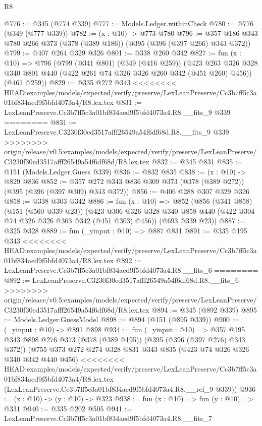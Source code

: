 \begin{lexlean}{R8}
\begin{coremodule}
{{{{{{{{{{{{{{{{{{{{{{{@776 := @345 (@774 @339)
@777 := Models.Ledger.withinCheck
@780 := @776 (@349 (@777 @339))
@782 := (x : @10) -> @773 @780
@796 := @357 @186 @343 @780 @266 @373 (@378 (@389 @186)) (@395 (@396 (@397 @266) @343 @372))
@799 := @407 @264 @329 @326
@801 := @338 @260 @342
@827 := fun (x : @10) =>
  @796
    (@799
      (@341 @801)
      (@349 (@416 @259))
      (@423 @263 @326 @328 @340 @801 @440 (@422 @261 @74 @326 @326 @260 @342 (@451 @260) @456))
      (@461 @259))
@829 := @335 @272 @343
<<<<<<<< HEAD:examples/models/expected/verify/preserve/LexLeanPreserve/Cc3b7ff5c3a01bf834aed9f5bfd4073a4/R8.lex.tex
@831 := LexLeanPreserve.Cc3b7ff5c3a01bf834aed9f5bfd4073a4.R8.__fits_9 @339
========
@831 := LexLeanPreserve.C3230f30ed3517afff26549a54f6df68d.R8.__fits_9 @339
>>>>>>>> origin/release/v0.5:examples/models/expected/verify/preserve/LexLeanPreserve/C3230f30ed3517afff26549a54f6df68d/R8.lex.tex
@832 := @345 @831
@835 := @151 (Models.Ledger.Guess @339)
@836 := @832 @835
@838 := (x : @10) -> @829 @836
@852 := @357 @272 @343 @836 @309 @373 (@378 (@389 @272)) (@395 (@396 (@397 @309) @343 @372))
@856 := @406 @288 @307 @329 @326
@858 := @338 @303 @342
@886 := fun (x : @10) =>
  @852
    (@856
      (@341 @858)
      (@151 (@560 @339 @23))
      (@423 @306 @326 @328 @340 @858 @440 (@422 @304 @74 @326 @326 @303 @342 (@451 @303) @456))
      (@693 @339 @23))
@887 := @325 @328
@889 := fun (_yinput : @10) => @887 @831
@891 := @335 @195 @343
<<<<<<<< HEAD:examples/models/expected/verify/preserve/LexLeanPreserve/Cc3b7ff5c3a01bf834aed9f5bfd4073a4/R8.lex.tex
@892 := LexLeanPreserve.Cc3b7ff5c3a01bf834aed9f5bfd4073a4.R8.__fits_6
========
@892 := LexLeanPreserve.C3230f30ed3517afff26549a54f6df68d.R8.__fits_6
>>>>>>>> origin/release/v0.5:examples/models/expected/verify/preserve/LexLeanPreserve/C3230f30ed3517afff26549a54f6df68d/R8.lex.tex
@894 := @345 (@892 @339)
@895 := Models.Ledger.GuessModel
@898 := @894 (@151 (@895 @339))
@900 := (_yinput : @10) -> @891 @898
@934 := fun (_yinput : @10) =>
  @357
    @195
    @343
    @898
    @276
    @373
    (@378 (@389 @195))
    (@395 (@396 (@397 @276) @343 @372))
    (@755
      @373
      @272
      @274
      @328
      @831
      @343
      @835
      (@423 @74 @326 @326 @340 @342 @440 @456)
<<<<<<<< HEAD:examples/models/expected/verify/preserve/LexLeanPreserve/Cc3b7ff5c3a01bf834aed9f5bfd4073a4/R8.lex.tex
      (LexLeanPreserve.Cc3b7ff5c3a01bf834aed9f5bfd4073a4.R8.__rel_9 @339))
@936 := (x : @10) -> (y : @10) -> @323
@938 := fun (x : @10) => fun (y : @10) => @331
@940 := @335 @202 @505
@941 := LexLeanPreserve.Cc3b7ff5c3a01bf834aed9f5bfd4073a4.R8.__fits_7
}}}}}}}}}}}}}}}}}}}}}}}
\end{coremodule}
\end{lexlean}
